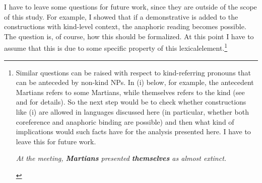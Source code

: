 \documentclass[output=paper,
modfonts
]{langscibook}
\begin{document}
	I have to leave some questions for future work, since they are outside of the scope of this study. For example, I showed that if a demonstrative is added to the constructions with kind-level context, the anaphoric reading becomes possible. The question is, of course, how this should be formalized. At this point I have to assume that this is due to some specific property of this lexical\largerpage[2] element.\footnote{Similar questions can be raised with respect to kind-referring pronouns that can be anteceded by non-kind NPs. In (i) below, for example, the antecedent Martians refers to some Martians, while themselves refers to the kind (see \citealt{Rooth1985} and \citealt{Krifka2003} for details). So the next step would be to check whether constructions like (i) are allowed in languages discussed here (in particular, whether both coreference and anaphoric binding are possible) and then what kind of implications would such facts have for the analysis presented here. I have to leave this for future work. 
		\begin{exe} 
		 \textit{At the meeting, \textbf{Martians} presented \textbf{themselves} as almost extinct.}
		\label{ex:despic:n13i}
		\end{exe} \label{ft13}
}
\end{document}
